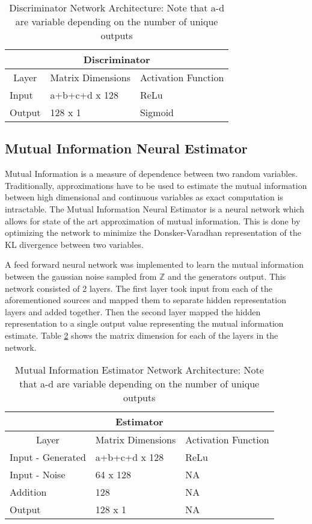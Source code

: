 \begin{table}[!htbp]
	\centering
	\caption{Discriminator Network Architecture: Note that a-d are variable depending on the number of unique outputs}
	\label{tab:model_simple_b}
	\begin{tabular}{l|l|l}
		\hline
		\multicolumn{3}{c}{\textbf{Discriminator}} \\ 
		\hline
		\multicolumn{1}{c|}{Layer} & \multicolumn{1}{c|}{Matrix Dimensions} & \multicolumn{1}{c}{Activation Function} \\ \hline
		Input & a+b+c+d x 128 & ReLu \\
		Output & 128 x 1 & Sigmoid \\
		\hline
	\end{tabular}
\end{table}


\subsection{Mutual Information Neural Estimator}
\label{sec:mine}
Mutual Information is a measure of dependence between two random variables. Traditionally, approximations have to be used to estimate the mutual information between high dimensional and continuous variables as exact computation is intractable. The Mutual Information Neural Estimator is a neural network which allows for state of the art approximation of mutual information. This is done by optimizing the network to minimize the Donsker-Varadhan representation of the KL divergence between two variables. 

A feed forward neural network was implemented to learn the mutual information between the gaussian noise sampled from $\mathbb{Z}$ and the generators output. This network consisted of 2 layers. The first layer took input from each of the aforementioned sources and mapped them to separate hidden representation layers and added together. Then the second layer mapped the hidden representation to a single output value representing the mutual information estimate. Table \ref{tab:model_mi} shows the matrix dimension for each of the layers in the network.

\begin{table}[!htbp]
	\centering
	\caption{Mutual Information Estimator Network Architecture: Note that a-d are variable depending on the number of unique outputs}
	\label{tab:model_mi}
	\begin{tabular}{l|l|l}
		\hline
		\multicolumn{3}{c}{\textbf{Estimator}} \\ 
		\hline
		\multicolumn{1}{c|}{Layer} & \multicolumn{1}{c|}{Matrix Dimensions} & \multicolumn{1}{c}{Activation Function} \\ \hline
		Input - Generated & a+b+c+d x 128 & ReLu \\
		Input - Noise & 64 x 128 & NA \\
		Addition & 128 & NA \\ 
		Output & 128 x 1 &  NA \\
		\hline
	\end{tabular}
\end{table}


